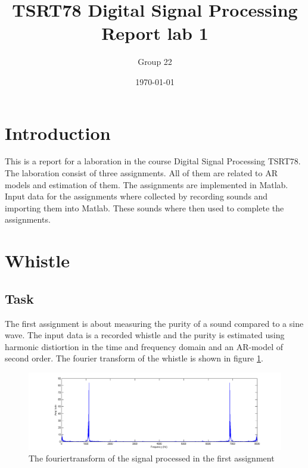 \documentclass[12pt]{article}
\title{TSRT78 Digital Signal Processing \\
Report lab 1}
\author{Group 22}
\date{\today}
\begin{document}
%

\pagebreak

\maketitle

\pagebreak

\tableofcontents

\clearpage

\section{Introduction}
This is a report for a laboration in the course Digital Signal Processing TSRT78.
The laboration consist of three assignments.
All of them are related to AR models and estimation of them.
The assignments are implemented in Matlab.
Input data for the assignments where collected by recording sounds and importing them into Matlab.
These sounds where then used to complete the assignments.

\section{Whistle}
\subsection{Task}
The first assignment is about measuring the purity of a sound compared to a sine wave. The input data is a recorded whistle and the purity is estimated using harmonic distiortion in the time and frequency domain and an AR-model of second order. The fourier transform of the whistle is shown in figure \ref{forwhis}.

\begin{figure}[H]
\centering
\includegraphics[width=14cm]{Fouriertranswhis.png}
\caption{The fouriertransform of the signal processed in the first assignment\label{forwhis}}

\end{figure}
\end{document}

